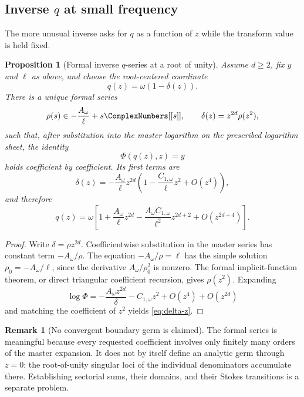 \documentclass[11pt]{article}
\newtheorem{proposition}[theorem]{Proposition}
\theoremstyle{definition}
\newtheorem{remark}[theorem]{Remark}
\begin{document}
\subsection{Inverse \texorpdfstring{$q$}{q} at small frequency}

The more unusual inverse asks for $q$ as a function of $z$ while the transform value is held fixed.

\begin{proposition}[Formal inverse $q$-series at a root of unity]
Assume $d\ge2$, fix $y$ and $\ell$ as above, and choose the root-centered coordinate
\begin{equation}
 q(z)=\omega(1-\delta(z)).
 \label{eq:qz}
\end{equation}
There is a unique formal series
\[
 \rho(s)\in -\frac{A_\omega}{\ell}+s\ComplexNumbers[[s]],
 \qquad \delta(z)=z^{2d}\rho(z^2),
\]
such that, after substitution into the master logarithm on the prescribed
logarithm sheet, the identity
\begin{equation}
 \Phi(q(z),z)=y
 \label{eq:q-inverse-eq}
\end{equation}
holds coefficient by coefficient.  Its first terms are
\begin{equation}
 \boxed{
 \delta(z)=-\frac{A_\omega}{\ell}z^{2d}
 \left(1-\frac{C_{1,\omega}}{\ell}z^2+O(z^4)\right),}
 \label{eq:delta-z}
\end{equation}
and therefore
\begin{equation}
 \boxed{
 q(z)=\omega\left[
 1+\frac{A_\omega}{\ell}z^{2d}
 -\frac{A_\omega C_{1,\omega}}{\ell^2}z^{2d+2}
 +O(z^{2d+4})
 \right].}
 \label{eq:q-z-expansion}
\end{equation}
\end{proposition}

\begin{proof}
Write $\delta=\rho z^{2d}$.  Coefficientwise substitution in the master
series has constant term
\(
 -A_\omega/\rho
\).  The equation $-A_\omega/\rho=\ell$ has the simple solution $\rho_0=-A_\omega/\ell$, since the derivative $A_\omega/\rho_0^2$ is nonzero.  The formal implicit-function theorem, or direct triangular coefficient recursion, gives $\rho(z^2)$.  Expanding
\[
 \log\Phi=-\frac{A_\omega z^{2d}}{\delta}
 -C_{1,\omega}z^2+O(z^4)+O(z^{2d})
\]
and matching the coefficient of $z^2$ yields \cref{eq:delta-z}.
\end{proof}

\begin{remark}[No convergent boundary germ is claimed]
The formal series is meaningful because every requested coefficient involves
only finitely many orders of the master expansion.  It does not by itself
define an analytic germ through $z=0$: the root-of-unity singular loci of the
individual denominators accumulate there.  Establishing sectorial sums, their
domains, and their Stokes transitions is a separate problem.
\end{remark}
\end{document}
